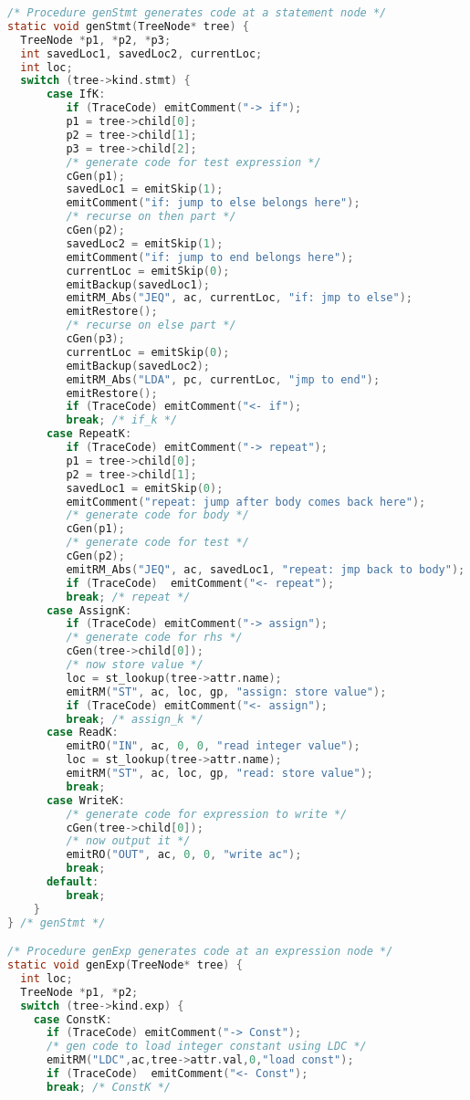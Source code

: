 \documentclass[lang=cn,10pt]{elegantbook}
\begin{document}
\begin{lstlisting}[caption={cgen.c},language=c]
/* Procedure genStmt generates code at a statement node */
static void genStmt(TreeNode* tree) {
  TreeNode *p1, *p2, *p3;
  int savedLoc1, savedLoc2, currentLoc;
  int loc;
  switch (tree->kind.stmt) {
      case IfK:
         if (TraceCode) emitComment("-> if");
         p1 = tree->child[0];
         p2 = tree->child[1];
         p3 = tree->child[2];
         /* generate code for test expression */
         cGen(p1);
         savedLoc1 = emitSkip(1);
         emitComment("if: jump to else belongs here");
         /* recurse on then part */
         cGen(p2);
         savedLoc2 = emitSkip(1);
         emitComment("if: jump to end belongs here");
         currentLoc = emitSkip(0);
         emitBackup(savedLoc1);
         emitRM_Abs("JEQ", ac, currentLoc, "if: jmp to else");
         emitRestore();
         /* recurse on else part */
         cGen(p3);
         currentLoc = emitSkip(0);
         emitBackup(savedLoc2);
         emitRM_Abs("LDA", pc, currentLoc, "jmp to end");
         emitRestore();
         if (TraceCode) emitComment("<- if");
         break; /* if_k */
      case RepeatK:
         if (TraceCode) emitComment("-> repeat");
         p1 = tree->child[0];
         p2 = tree->child[1];
         savedLoc1 = emitSkip(0);
         emitComment("repeat: jump after body comes back here");
         /* generate code for body */
         cGen(p1);
         /* generate code for test */
         cGen(p2);
         emitRM_Abs("JEQ", ac, savedLoc1, "repeat: jmp back to body");
         if (TraceCode)  emitComment("<- repeat");
         break; /* repeat */
      case AssignK:
         if (TraceCode) emitComment("-> assign");
         /* generate code for rhs */
         cGen(tree->child[0]);
         /* now store value */
         loc = st_lookup(tree->attr.name);
         emitRM("ST", ac, loc, gp, "assign: store value");
         if (TraceCode) emitComment("<- assign");
         break; /* assign_k */
      case ReadK:
         emitRO("IN", ac, 0, 0, "read integer value");
         loc = st_lookup(tree->attr.name);
         emitRM("ST", ac, loc, gp, "read: store value");
         break;
      case WriteK:
         /* generate code for expression to write */
         cGen(tree->child[0]);
         /* now output it */
         emitRO("OUT", ac, 0, 0, "write ac");
         break;
      default:
         break;
    }
} /* genStmt */

/* Procedure genExp generates code at an expression node */
static void genExp(TreeNode* tree) {
  int loc;
  TreeNode *p1, *p2;
  switch (tree->kind.exp) {
    case ConstK:
      if (TraceCode) emitComment("-> Const");
      /* gen code to load integer constant using LDC */
      emitRM("LDC",ac,tree->attr.val,0,"load const");
      if (TraceCode)  emitComment("<- Const");
      break; /* ConstK */
    

\end{lstlisting}
\end{document}
